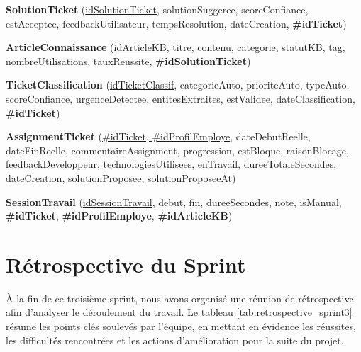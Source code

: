 \noindent\textbf{SolutionTicket} (\underline{idSolutionTicket}, solutionSuggeree, scoreConfiance, estAcceptee, feedbackUtilisateur, tempsResolution, dateCreation, \textbf{\#idTicket})

\noindent\textbf{ArticleConnaissance} (\underline{idArticleKB}, titre, contenu, categorie, statutKB, tag, nombreUtilisations, tauxReussite, \textbf{\#idSolutionTicket})

\noindent\textbf{TicketClassification} (\underline{idTicketClassif}, categorieAuto, prioriteAuto, typeAuto, scoreConfiance, urgenceDetectee, entitesExtraites, estValidee, dateClassification, \textbf{\#idTicket})

\noindent\textbf{AssignmentTicket} (\underline{\#idTicket, \#idProfilEmploye}, dateDebutReelle, dateFinReelle, commentaireAssignment, progression, estBloque, raisonBlocage, feedbackDeveloppeur, technologiesUtilisees, enTravail, dureeTotaleSecondes, dateCreation, solutionProposee, solutionProposeeAt)

\noindent\textbf{SessionTravail} (\underline{idSessionTravail}, debut, fin, dureeSecondes, note, isManual, \textbf{\#idTicket}, \textbf{\#idProfilEmploye}, \textbf{\#idArticleKB})
\section{Rétrospective du Sprint}
\label{sec:retro_sprint3}
À la fin de ce troisième sprint, nous avons organisé une réunion de rétrospective afin d'analyser le déroulement du travail. Le tableau \ref{tab:retrospective_sprint3} résume les points clés soulevés par l'équipe, en mettant en évidence les réussites, les difficultés rencontrées et les actions d'amélioration pour la suite du projet.

